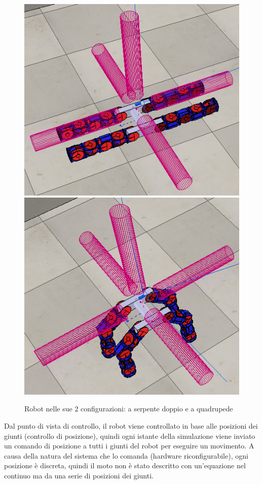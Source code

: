 \documentclass[11pt]{article} %
\begin{document}
\begin{figure}[htbp]
\centering
\includegraphics[scale=0.3]{tobor_sdraiato.png}
\qquad\qquad
\includegraphics[scale=0.3]{tobor_quadrupede.png}
\caption{Robot nelle sue 2 configurazioni: a serpente doppio e a quadrupede}\label{fig:71}
\end{figure}

Dal punto di vista di controllo, il robot viene controllato in base alle posizioni dei giunti (controllo di posizione), quindi ogni istante della simulazione viene inviato un comando di posizione a tutti i giunti del robot per eseguire un movimento.
A causa della natura del sistema che lo comanda (hardware riconfigurabile), ogni posizione è discreta, quindi il moto non è stato descritto con un'equazione nel continuo ma da una serie di posizioni dei giunti.
\end{document}

